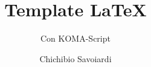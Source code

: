 \subject{Tipografia}
\title{Template \LaTeX}
\subtitle{Con KOMA-Script}
\author{Chichibio Savoiardi}
\date{\ISOToday ~ \thistime}
